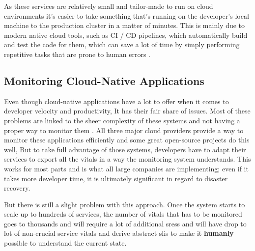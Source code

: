As these services are relatively small and tailor-made to run on cloud environments it's easier to take something that's running on the developer's local machine to the production cluster in a matter of minutes. This is mainly due to modern native cloud tools, such as CI / CD pipelines, which automatically build and test the code for them, which can save a lot of time by simply performing repetitive tasks that are prone to human errors \citep{Whataret68:online}.

\subsection{Monitoring Cloud-Native Applications} \label{monitoring-bg}
Even though cloud-native applications have a lot to offer when it comes to developer velocity and productivity, It has their fair share of issues. Most of these problems are linked to the sheer complexity of these systems and not having a proper way to monitor them \citep{5WaysYou35:online}. All three major cloud providers provide a way to monitor these applications efficiently and some great open-source projects do this well, But to take full advantage of those systems, developers have to adapt their services to export all the vitals in a way the monitoring system understands. This works for most parts and is what all large companies are implementing; even if it takes more developer time, it is ultimately significant in regard to disaster recovery.

But there is still a slight problem with this approach. Once the system starts to scale up to hundreds of services, the number of vitals that has to be monitored goes to thousands and will require a lot of additional \acp{sres} and will have drop to lot of non-crucial service vitals and derive abstract \acp{sli} to make it \textbf{humanly} possible to understand the current state.\\
